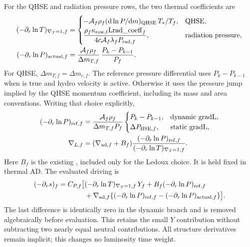 \documentclass[11pt]{article}
\newcommand{\code}[1]{\texttt{\detokenize{#1}}}
\newcommand{\dd}{\mathrm d}
\newcommand{\area}{\mathcal A}
\newcommand{\dmf}{\Delta m_{c,f}}
\newcommand{\negds}{(-\partial_r s)}
\numberwithin{equation}{section}
\begin{document}
For the QHSE and radiation pressure rows, the two thermal coefficients are
\begin{align}
 (-\partial_r\ln T)_{\nabla_T=1,f}
 &=\begin{cases}
 -\area_f\rho_f(\dd\ln P/\dd m)_{\rm QHSE}\,T_*/T_f,
                      &\text{QHSE},\\[2pt]
 \displaystyle\frac{\rho_f\kappa_{\rm row,f}\mathrm{Lrad\_coeff}_f}
       {4c\area_f\lambda_fP_{{\rm rad},f}},
                      &\text{radiation pressure},
 \end{cases}\\
 (-\partial_r\ln P)_{{\rm actual},f}
 &=\frac{\area_f\rho_f}{\Delta m_{T,f}}\,
                     \frac{P_k-P_{k-1}}{P_f}.
\end{align}
For QHSE, $\Delta m_{T,f}=\dmf$.
The reference pressure differential uses $P_k-P_{k-1}$ when
 is true and hydro velocity is active.
Otherwise it uses the pressure jump implied by the QHSE momentum
coefficient, including its mass and area conventions.
Writing that choice explicitly,
\begin{align}
 (-\partial_r\ln P)_{{\rm ref},f}
 &=\frac{\area_f\rho_f}{\Delta m_{T,f}P_f}
 \begin{cases}
 P_k-P_{k-1},&\text{dynamic gradL},\\
 \Delta P_{{\rm HSE},f},&\text{static gradL},
 \end{cases}\\
 \nabla_{L,f}
 &=(\nabla_{{\rm ad},f}+B_f)
 \frac{(-\partial_r\ln P)_{{\rm ref},f}}
      {(-\partial_r\ln T)_{\nabla_T=1,f}} .
\end{align}
Here $B_f$ is the existing \code{gradL_composition_term}, included only for
the Ledoux choice. It is held fixed in thermal AD.
The evaluated driving is
\begin{equation}
\begin{aligned}
 \negds_f=C_{P,f}\big[&
 (-\partial_r\ln T)_{\nabla_T=1,f}\,Y_f
 +B_f(-\partial_r\ln P)_{{\rm ref},f}\\
 &+\nabla_{{\rm ad},f}
 \{(-\partial_r\ln P)_{{\rm ref},f}
             -(-\partial_r\ln P)_{{\rm actual},f}\}\big].
\end{aligned}
\label{eq:driving}
\end{equation}
The last difference is identically zero in the dynamic branch and is
removed algebraically before evaluation. This retains the small $Y$
contribution without subtracting two nearly equal neutral contributions.
All structure derivatives remain implicit; this changes no luminosity
time weight.
\end{document}
